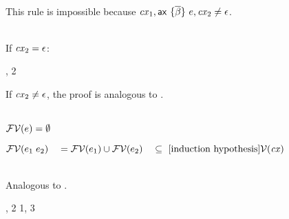 \begin{bycase}

\Case{\Rcxmt}\\
This rule is impossible because $\mathit{cx}_1,\mathsf{ax}\ \{\overline{\beta}\}\ e,\mathit{cx}_2\neq\epsilon$.

\Case{\Rcxtdec, \Rcxodec, \Rcxlem, \Rcxtvdec, \Rcxvdec}
\begin{derivation}
\steP{\cx_2\neq\mtcx}
\end{derivation}

\Case{\Rcxax}\\
If $\mathit{cx}_2=\epsilon$:
\begin{derivation}
     {\indhyp, 2}
\end{derivation}
If $\mathit{cx}_2\neq\epsilon$, the proof is analogous to \Rcxtdec.

\Case{\Reop, \Redesc, \Reproj}\\
$\mathcal{FV}(e)=\emptyset$

\Case{\Revar}
\begin{derivation}
\step{\vdecO\in\cx}{\premof{\Revar}}
\end{derivation}

\Case{\Reapp}
\begin{links}
$\mathcal{FV}(e_1\;e_2)
 \\\hspace*{1em}=\\
 \mathcal{FV}(e_1)\cup\mathcal{FV}(e_2)
 \\\hspace*{1em}\subseteq\ [\mbox{induction hypothesis}]\\
 \mathcal{V}(\mathit{cx})$
\end{links}

\Case{\Reeq, \Reif, \Resuper, \Resub}\\
Analogous to \Reapp.

\Case{\Reabs}
\begin{derivation}
\step{\efvar{\expr}\subseteq\cxvar{\snoc{\cx}{\vdecO}}}{\indhyp}
\end{derivation}
\Case{\Reabsalpha}
\begin{derivation}
\step{\efvar{\absO}\subseteq\cxvarO}{\indhyp}
     {, 2}
     {1, 3}
\end{derivation}


\end{bycase}
